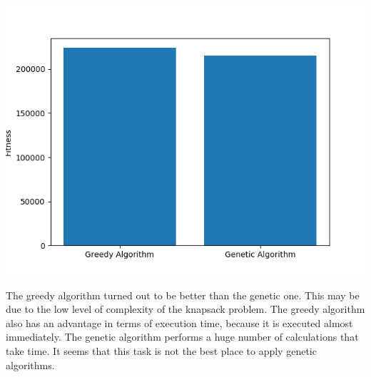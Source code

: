 \documentclass[12pt]{article}
\begin{document}
\includegraphics[scale=0.7]{evol_vs_nonevol}

The greedy algorithm turned out to be better than the genetic one. This may be due to the low level of complexity of the knapsack problem. The greedy algorithm also has an advantage in terms of execution time, because it is executed almost immediately. The genetic algorithm performs a huge number of calculations that take time. It seems that this task is not the best place to apply genetic algorithms. 
\end{document}
